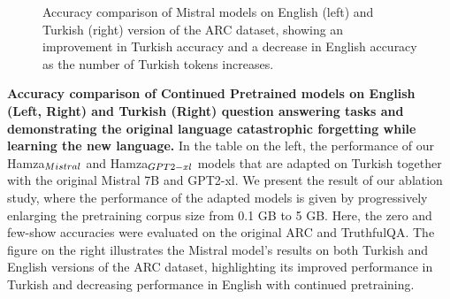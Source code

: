 \documentclass{article}
\begin{document}
\begin{figure}[h]
    \centering
    \caption{Accuracy comparison of Mistral models on English (left) and Turkish (right) version of the ARC dataset, showing an improvement in Turkish accuracy and a decrease in English accuracy as the number of Turkish tokens increases.}
    \label{fig:arc_scores_mistral}
\end{figure}

\textbf{Accuracy comparison of Continued Pretrained models on English (Left, Right) and Turkish (Right) question answering tasks and demonstrating the original language catastrophic forgetting while learning the new language.} In the table on the left, the performance of our Hamza$_{\scriptsize Mistral}$ and Hamza$_{\scriptsize GPT2-xl}$ models that are adapted on Turkish together with the original Mistral 7B and GPT2-xl. We present the result of our ablation study, where the performance of the adapted models is given by progressively enlarging the pretraining corpus size from 0.1 GB to 5 GB. Here, the zero and few-show accuracies were evaluated on the original ARC and TruthfulQA. The figure on the right illustrates the Mistral model's results on both Turkish and English versions of the ARC dataset, highlighting its improved performance in Turkish and decreasing performance in English with continued pretraining.
\end{document}
